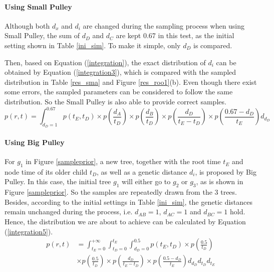 \documentclass{bmcart}
\begin{document}
\begin{backmatter}
\paragraph*{Using Small Pulley}

Although both ${d_x}$ and ${d_i}$ are changed during the sampling process when using Small Pulley, the sum of ${d_D}$ and ${d_C}$ are kept 0.67 in this test, as the initial setting shown in Table \ref{ini_sim}. To make it simple, only ${d_D}$ is compared.

Then, based on Equation (\ref{integration}), the exact distribution of ${d_i}$ can be obtained by Equation (\ref{integration3}), which is compared with the sampled distribution in Table \ref{res_sma} and Figure \ref{res_roo1}(b). Even though there exist some errors, the sampled parameters can be considered to follow the same distribution. So the Small Pulley is also able to provide correct samples.
\begin{equation}\label{integration3}
p(r,t) = \int_{{d_D} = 1}^{0.67} {p({t_E},{t_D}) \times p(\frac{{{d_A}}}{{{t_D}}}) \times p(\frac{{{d_B}}}{{{t_D}}}) \times p(\frac{{{d_D}}}{{{t_E} - {t_D}}}) \times p(\frac{{0.67 - {d_D}}}{{{t_E}}}){d_{d_D}}}
\end{equation}

\paragraph*{Using Big Pulley}

For $g_1$ in Figure \ref{sampleprior}, a new tree, together with the root time $t_E$ and node time of its older child $t_D$, as well as a genetic distance $d_i$, is proposed by Big Pulley. In this case, the initial tree $g_1$ will either go to $g_2$ or $g_3$, as is shown in Figure \ref{sampleprior}.  So the samples are repeatedly drawn from the 3 trees. Besides, according to the initial settings in Table \ref{ini_sim}, the genetic distances remain unchanged during the process, i.e. $d_{AB} = 1$, $d_{AC}  = 1$ and $d_{BC} = 1$ hold. Hence, the distribution we are about to achieve can be calculated by Equation (\ref{integration5}).
\begin{equation}\label{integration5}
\begin{aligned}
p(r,t) &= \int_{{t_E} = 0}^{ + \infty } {\int_{{t_D} = 0}^{{t_E}} {\int_{{d_D} = 0}^{0.5} {p({t_E},{t_D})} } \times p(\frac{{0.5}}{{{t_D}}})}  \\&\times p(\frac{{0.5}}{{{t_D}}}) \times p(\frac{{{d_D}}}{{{t_E} - {t_D}}}) \times p(\frac{{0.5 - {d_D}}}{{{t_E}}}){d_{d_D}}{d_{t_D}}{d_{t_E}}
\end{aligned}
\end{equation}


\end{backmatter}
\end{document}
